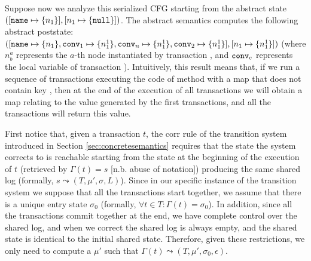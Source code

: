 Suppose now we analyze this serialized CFG starting from the abstract state $([\mathtt{name} \mapsto \{n_1\}], [n_1 \mapsto \{\mathtt{null}\}])$. The abstract semantics computes the following abstract poststate: $([\mathtt{name} \mapsto \{n_1\}, \mathtt{conv}_1 \mapsto \{n^1_1\}, \mathtt{conv}_n \mapsto \{n^1_1\}, \mathtt{conv}_2 \mapsto \{n^1_1\}], [n_1 \mapsto \{n^1_1\}])$ (where $n^a_b$ represents the $a$-th node instantiated by transaction , and $\mathtt{conv}_c$ represents the local variable  of transaction ). Intuitively, this result means that, if we run a sequence of transactions executing the code of method  with a map that does not contain key , then at the end of the execution of all transactions we will obtain a map relating  to the value generated by the first transactions, and all the transactions will return this value.

%
First notice that, given a transaction $t$, the {\sf corr} rule of the transition system introduced in Section \ref{sec:concretesemantics} requires that the state the system corrects to is reachable starting from the state at the beginning of the execution of $t$ (retrieved by $\Gamma(t) =s$ [n.b. abuse of notation]) producing the same shared log (formally, $s \leadsto (T,\mu', \sigma, L)$). Since in our specific instance of the transition system we suppose that all the transactions start together, we assume that there is a unique entry state $\sigma_0$ (formally, $\forall t \in T : \Gamma(t)=\sigma_0$). In addition, since all the transactions commit together at the end, we have complete control over the shared log, and when we correct the shared log is always empty, and the shared state is identical to the initial shared state. Therefore, given these restrictions, we only need to compute a $\mu'$ such that $\Gamma(t) \leadsto (T,\mu', \sigma_0, \epsilon)$.

